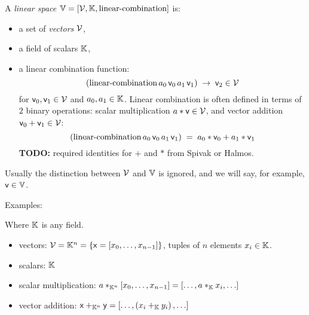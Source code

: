 \begin{definition}
\bigskip
A \textit{linear space} 
$\mathbb{V} = \left[ \mathcal{V}, \mathbb{K}, \text{linear-combination} \right]$
 is:
\begin{itemize}
  \item a set of \textit{vectors} $\mathcal{V}$,
  \item a field  of scalars $\mathbb{K}$,
  \item a linear combination function: 
\begin{equation}
\left( \text{linear-combination} 
\, a_0 \, \mathsf{v}_0 \, a_1 \, \mathsf{v}_1 \right) \; 
 \rightarrow \; \mathsf{v}_2  \in \mathcal{V}
\end{equation}
for $\mathsf{v}_0, \mathsf{v}_1 \in \mathcal{V} $
and $a_0, a_1 \in \mathbb{K}$.
Linear combination is often defined in terms of
$2$ binary operations:
scalar multiplication $a * \mathsf{v} \in \mathcal{V}$,
and vector addition $\mathsf{v}_0 + \mathsf{v}_1 \in \mathcal{V}$:
\begin{equation}
\left( \text{linear-combination} 
\, a_0 \, \mathsf{v}_0 \, a_1 \, \mathsf{v}_1 \right) \; 
= \; a_0*\mathsf{v}_0 + a_1*\mathsf{v}_1
\end{equation}
\textbf{TODO:} required identities for $+$ and $*$ from Spivak or Halmos.
\end{itemize}
\end{definition}
Usually the distinction between $\mathcal{V}$ and $\mathbb{V}$ 
is ignored, and we will say, for example, 
$\mathsf{v} \in \mathbb{V}$.

Examples:

\begin{example}[$\Space{K}^n$]
Where $\mathbb{K}$ is any field.
\begin{itemize}
  \item vectors:
  $\mathcal{V} = \mathbb{K}^n = \{ \mathsf{x}
  = \left[ x_0, \ldots , x_{n-1} \right] \}$,
  tuples of $n$ elements $x_i \in \mathbb{K}$.
  \item scalars: $\mathbb{K}$
  \item scalar multiplication:
  $ a *_{\mathbb{K}^n} \left[ x_0, \ldots , x_{n-1} \right] =
  \left[ \ldots , a *_{\mathbb{K}} x_{i} , \ldots \right]$
  \item vector addition:
  $\mathsf{x} +_{\mathbb{K}^n} \mathsf{y}
  = \left[ \ldots , \left( x_i +_{\mathbb{K}} y_i \right) ,\ldots \right]$
\end{itemize}
\end{example}

